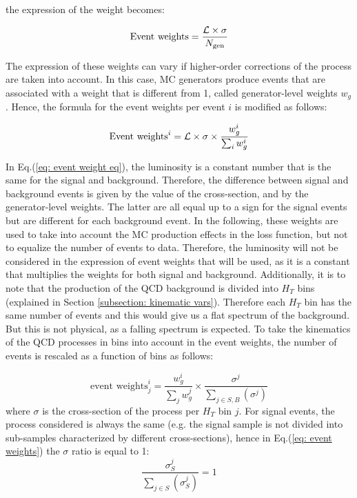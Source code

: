 \noindent the expression of the weight becomes:

\begin{equation}
    \text{Event weights} = \frac{{\mathcal{L}} \times \sigma}{N_{\text{gen}}}
\end{equation}

The expression of these weights can vary if higher-order corrections of the process are taken into account. In this case, MC generators produce events that are associated with a weight that is different from 1, called generator-level weights $w_g$.
Hence, the formula for the event weights per event $i$ is modified as follows:

\begin{equation}
    \text{Event weights}^i = {\mathcal{L}} \times \sigma \times \frac{w_g^i}{\sum_i w_g^i}
    \label{eq: event weight eq}
\end{equation}

In Eq.(\ref{eq: event weight eq}), the luminosity is a constant number that is the same for the signal and background. Therefore, the difference between signal and background events is given by the value of the cross-section, and by the generator-level weights. The latter are all equal up to a sign for the signal events but are different for each background event. In the following, these weights are used to take into account the MC production effects in the loss function, but not to equalize the number of events to data. Therefore, the luminosity will not be considered in the expression of event weights that will be used, as it is a constant that multiplies the weights for both signal and background. Additionally, it is to note that the production of the QCD background is divided into $H_T$ bins (explained in Section \ref{subsection: kinematic vars}). Therefore each $H_T$ bin has the same number of events and this would give us a flat \Ht spectrum of the background. But this is not physical, as a falling \Ht spectrum is expected. To take the kinematics of the QCD processes in \Ht bins into account in the event weights, the number of events is rescaled as a function of \Ht bins as follows:

\begin{equation}
	\text{event weights}^i_j =\frac{w_g^i}{\sum_j w_g^j} \times \frac{\sigma^j}{\sum_{j\in S,B}(\sigma^j)}
 \label{eq: event weights}
\end{equation}
\noindent where $\sigma$ is the cross-section of the process per $H_T$ bin $j$. For signal events, the process considered is always the same (e.g. the signal sample is not divided into sub-samples characterized by different cross-sections), hence in Eq.(\ref{eq: event weights}) the $\sigma$ ratio is equal to 1:
\begin{equation}
	\frac{\sigma_S^j}{\sum_{j\in S}(\sigma_S^j)}=1
\end{equation}

